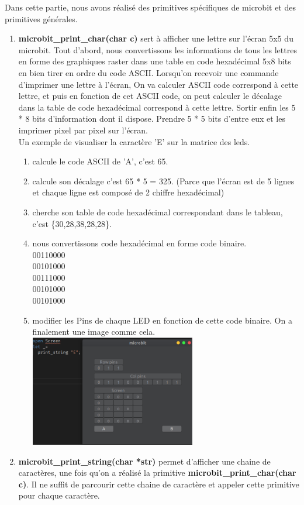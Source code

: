 \documentclass[14px]{article}
\begin{document}
	Dans cette partie, nous avons réalisé des primitives spécifiques de microbit et des primitives générales.
	\begin{enumerate}
		\item \textbf{microbit\_print\_char(char c)} sert à afficher une lettre sur l'écran 5x5 du microbit.
		Tout d'abord, nous convertissons les informations de tous les lettres en forme des graphiques raster dans une table en code hexadécimal 5x8 bits en bien tirer en ordre du code ASCII. Lorsqu'on recevoir une commande d'imprimer une lettre à l'écran,
		On va calculer ASCII code correspond à cette lettre, et puis en fonction de cet ASCII code, on peut calculer le décalage dans la table de code hexadécimal correspond à cette lettre. Sortir enfin les 5 * 8 bits d'information dont il dispose. Prendre 5 * 5 bits d'entre eux et les imprimer pixel par pixel sur l'écran.\\

		Un exemple de visualiser la caractère 'E' sur la matrice des leds.
		\begin{enumerate}
			\item calcule le code ASCII de 'A', c'est 65.
			\item calcule son décalage c'est 65 * 5 = 325. (Parce que l'écran est de 5 lignes et chaque ligne est composé de 2 chiffre hexadécimal)
			\item cherche son table de code hexadécimal correspondant dans le tableau, c'est \{30,28,38,28,28\}.
			\item nous convertissons code hexadécimal en forme code binaire.\\
			00110000\\
			00101000\\
			00111000\\
			00101000\\
			00101000
			\item modifier les Pins de chaque LED en fonction de cette code binaire. On a finalement une image comme cela.\\
			\includegraphics[width=0.6\textwidth]{printE.png}\\[1cm]
		\end{enumerate}
		\item \textbf{microbit\_print\_string(char *str)} permet d'afficher une chaine de caractères, une fois qu'on a réalisé la primitive \textbf{microbit\_print\_char(char c)}. Il ne suffit de parcourir cette chaine de caractère et appeler cette primitive pour chaque caractère.
		

\end{enumerate}
\end{document}

